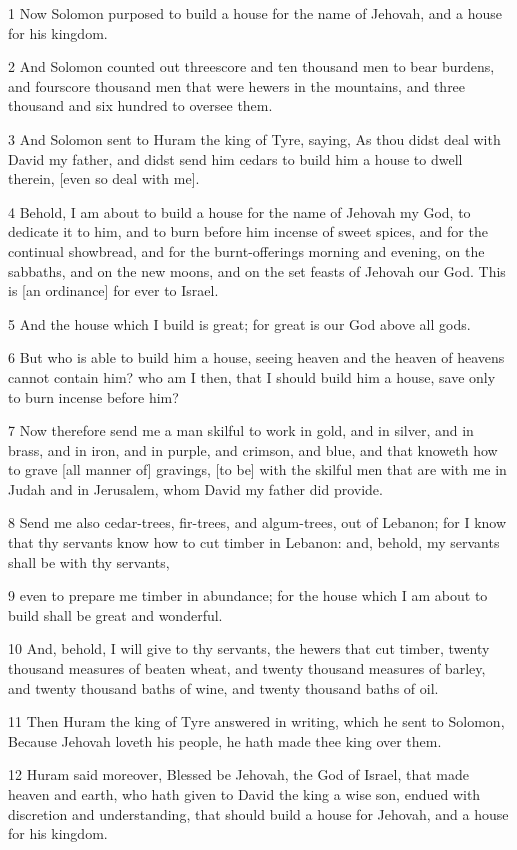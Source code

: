 \par 1 Now Solomon purposed to build a house for the name of Jehovah, and a house for his kingdom.
\par 2 And Solomon counted out threescore and ten thousand men to bear burdens, and fourscore thousand men that were hewers in the mountains, and three thousand and six hundred to oversee them.
\par 3 And Solomon sent to Huram the king of Tyre, saying, As thou didst deal with David my father, and didst send him cedars to build him a house to dwell therein, [even so deal with me].
\par 4 Behold, I am about to build a house for the name of Jehovah my God, to dedicate it to him, and to burn before him incense of sweet spices, and for the continual showbread, and for the burnt-offerings morning and evening, on the sabbaths, and on the new moons, and on the set feasts of Jehovah our God. This is [an ordinance] for ever to Israel.
\par 5 And the house which I build is great; for great is our God above all gods.
\par 6 But who is able to build him a house, seeing heaven and the heaven of heavens cannot contain him? who am I then, that I should build him a house, save only to burn incense before him?
\par 7 Now therefore send me a man skilful to work in gold, and in silver, and in brass, and in iron, and in purple, and crimson, and blue, and that knoweth how to grave [all manner of] gravings, [to be] with the skilful men that are with me in Judah and in Jerusalem, whom David my father did provide.
\par 8 Send me also cedar-trees, fir-trees, and algum-trees, out of Lebanon; for I know that thy servants know how to cut timber in Lebanon: and, behold, my servants shall be with thy servants,
\par 9 even to prepare me timber in abundance; for the house which I am about to build shall be great and wonderful.
\par 10 And, behold, I will give to thy servants, the hewers that cut timber, twenty thousand measures of beaten wheat, and twenty thousand measures of barley, and twenty thousand baths of wine, and twenty thousand baths of oil.
\par 11 Then Huram the king of Tyre answered in writing, which he sent to Solomon, Because Jehovah loveth his people, he hath made thee king over them.
\par 12 Huram said moreover, Blessed be Jehovah, the God of Israel, that made heaven and earth, who hath given to David the king a wise son, endued with discretion and understanding, that should build a house for Jehovah, and a house for his kingdom.
